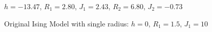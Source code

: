\documentclass[12pt,letterpaper,cm]{article}
\renewcommand{\.}{\cdot}
\newcommand{\<}{\langle}
\renewcommand{\>}{\rangle}
\begin{document}
	\begin{figure}[hbt]
		\centering
		
		\caption{$h = -13.47$, $R_1 = 2.80$, $J_1 = 2.43$, $R_2 = 6.80$,  $J_2 = -0.73$}
		\label{fig:FastVar}
		
	\end{figure}


	\begin{figure}[hbt]
		\centering
		
		\caption{Original Ising Model with single radius: $h = 0$, $R_1 = 1.5$, $J_1 = 10$}
		\label{fig:FastVar}
		
	\end{figure}
\end{document}
